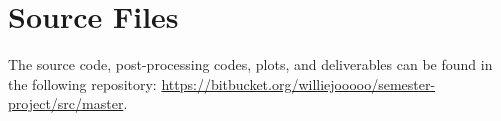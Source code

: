 \documentclass[a4paper]{article}
\newcommand*\GitHubLoc{https://bitbucket.org/williejooooo/semester-project/src/master}
\begin{document}
\section{Source Files}
The source code, post-processing codes, plots, and deliverables can be found in the following repository: \url{\GitHubLoc}.

\noindent
\clearpage


\end{document}

